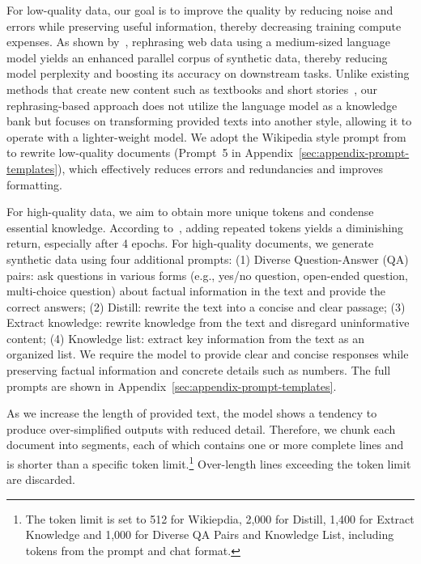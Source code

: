\documentclass[11pt]{article}
\begin{document}
For low-quality data, our goal is to improve the quality by reducing noise and errors while preserving useful information, thereby decreasing training compute expenses. As shown by~\citet{maini2024rephrasing}, rephrasing web data using a medium-sized language model yields an enhanced parallel corpus of synthetic data, thereby reducing model perplexity and boosting its accuracy on downstream tasks.
Unlike existing methods that create new content such as textbooks and short stories~\cite{wang2023self,eldan2023tinystories,gunasekar2023textbooks}, our rephrasing-based approach does not utilize the language model as a knowledge bank but focuses on transforming provided texts into another style, allowing it to operate with a lighter-weight model.
We adopt the \textrm{Wikipedia} style prompt from~\citep{maini2024rephrasing}
to rewrite low-quality documents (Prompt~5 in Appendix~\ref{sec:appendix-prompt-templates}), which effectively reduces errors and redundancies and improves formatting.

For high-quality data, we aim to obtain more unique tokens and condense essential knowledge. According to~\citep{muennighoff2024scaling}, adding repeated tokens yields a diminishing return, especially after 4 epochs.
For high-quality documents, we generate synthetic data using four additional prompts:
(1) \textrm{Diverse Question-Answer (QA) pairs}: ask questions in various forms (e.g., yes/no question, open-ended question, multi-choice question) about factual information in the text and provide the correct answers;
(2) \textrm{Distill}: rewrite the text into a concise and clear passage;
(3) \textrm{Extract knowledge}: rewrite knowledge from the text and disregard uninformative content;
(4) \textrm{Knowledge list}: extract key information from the text as an organized list.
We require the model to provide clear and concise responses while preserving factual information and concrete details such as numbers.
The full prompts are shown in Appendix~\ref{sec:appendix-prompt-templates}.

As we increase the length of provided text, the model shows a tendency to produce over-simplified outputs with reduced detail. Therefore, we chunk each document into segments, each of which contains one or more complete lines and is shorter than a specific token limit.\footnote{The token limit is set to 512 for \textrm{Wikiepdia}, 2,000 for \textrm{Distill}, 1,400 for \textrm{Extract Knowledge} and 1,000 for \textrm{Diverse QA Pairs} and \textrm{Knowledge List}, including tokens from the prompt and chat format.} Over-length lines exceeding the token limit are discarded.
\end{document}
